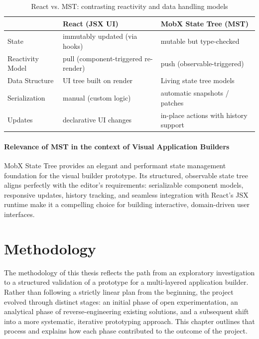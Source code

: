 \documentclass[oneside,12pt]{book}
\begin{document}
\begin{table}[h]
  \centering
  \small
  \begin{tabular}{@{}lll@{}}
    \toprule
    & \textbf{React (JSX UI)} & \textbf{MobX State Tree (MST)} \\
    \midrule
    State & immutably updated (via hooks) & mutable but type-checked \\
    Reactivity Model & pull (component-triggered re-render) & push (observable-triggered) \\
    Data Structure & UI tree built on render & Living state tree models \\
    Serialization & manual (custom logic) & automatic snapshots / patches \\
    Updates & declarative UI changes & in-place actions with history support \\
    \bottomrule
  \end{tabular}
  \caption{React vs. MST: contrasting reactivity and data handling models}
  \label{tab:react_vs_mst}
\end{table}

\subsubsection{Relevance of MST in the context of Visual Application Builders }

MobX State Tree provides an elegant and performant state management foundation for the visual builder prototype. 
Its structured, observable state tree aligns perfectly with the editor’s requirements: serializable component models, responsive updates, history tracking, and seamless integration with React’s JSX runtime make it a compelling choice for building interactive, domain-driven user interfaces.

\chapter{Methodology}

The methodology of this thesis reflects the path from an exploratory investigation to a structured validation of a prototype for a multi-layered application builder. Rather than following a strictly linear plan from the beginning, the project evolved through distinct stages: an initial phase of open experimentation, an analytical phase of reverse-engineering existing solutions, and a subsequent shift into a more systematic, iterative prototyping approach. This chapter outlines that process and explains how each phase contributed to the outcome of the project.
\end{document}

